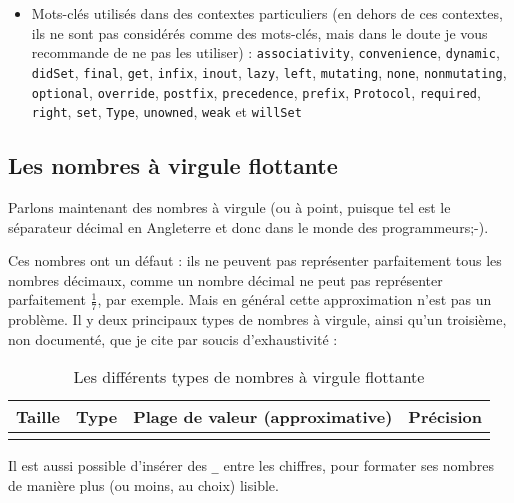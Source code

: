 \begin{itemize}
\item Mots-clés utilisés dans des contextes particuliers (en dehors de ces contextes, ils ne sont pas considérés comme des mots-clés,
mais dans le doute je vous recommande de ne pas les utiliser) :
\texttt{associativity},
\texttt{convenience},
\texttt{dynamic},
\texttt{didSet},
\texttt{final},
\texttt{get},
\texttt{infix},
\texttt{inout},
\texttt{lazy},
\texttt{left},
\texttt{mutating},
\texttt{none},
\texttt{nonmutating},
\texttt{optional},
\texttt{override},
\texttt{postfix},
\texttt{precedence},
\texttt{prefix},
\texttt{Protocol},
\texttt{required},
\texttt{right},
\texttt{set},
\texttt{Type},
\texttt{unowned},
\texttt{weak} et
\texttt{willSet}
\end{itemize}

\subsection{Les nombres à virgule flottante}

Parlons maintenant des nombres à virgule (ou à point, puisque tel est le séparateur décimal en Angleterre et donc dans le monde des programmeurs;-).

Ces nombres ont un  défaut :
ils ne peuvent pas représenter parfaitement tous les nombres décimaux,
comme un nombre décimal ne peut pas représenter parfaitement
\begin{math} \frac{1}{7} \end{math}, par exemple.
Mais en général cette approximation n'est pas un problème.
Il y deux principaux types de nombres à virgule, ainsi qu'un troisième,
non documenté, que je cite par soucis d'exhaustivité :
\begin{longtabu} to \linewidth {|X[3,l,m]|X[2,l,m]|X[4,r,m]|X[3,r,m]|}
\hline Taille & Type & Plage de valeur (approximative) & Précision \\ \hline
\endhead

\caption{Les différents types de nombres à virgule flottante}
\end{longtabu}

Il est aussi possible d'insérer des \verb"_" entre les chiffres,
pour formater ses nombres de manière plus (ou moins, au choix) lisible.

